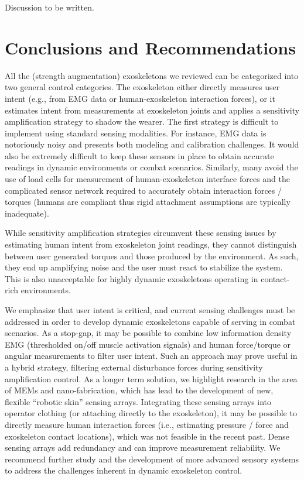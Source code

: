 \documentclass[letterpaper,12pt,fullpage]{article}
\begin{document}
Discussion to be written.

\section{Conclusions and Recommendations}
\label{survey:recommend}

All the (strength augmentation) exoskeletons we reviewed can be categorized into two general control categories.  The exoskeleton either directly measures user intent (e.g., from EMG data or human-exoskeleton interaction forces), or it estimates intent from measurements at exoskeleton joints and applies a sensitivity amplification strategy to shadow the wearer.  The first strategy is difficult to implement using standard sensing modalities.  For instance, EMG data is notoriously noisy and presents both modeling and calibration challenges.  It would also be extremely difficult to keep these sensors in place to obtain accurate readings in dynamic environments or combat scenarios.  Similarly, many avoid the use of load cells for measurement of human-exoskeleton interface forces and the complicated sensor network required to accurately obtain interaction forces / torques (humans are compliant thus rigid attachment assumptions are typically inadequate).

While sensitivity amplification strategies circumvent these sensing issues by estimating human intent from exoskeleton joint readings, they cannot distinguish between user generated torques and those produced by the environment.  As such, they end up amplifying noise and the user must react to stabilize the system.  This is also unacceptable for highly dynamic exoskeletons operating in contact-rich environments.

We emphasize that user intent is critical, and current sensing challenges must be addressed in order to develop dynamic exoskeletons capable of serving in combat scenarios.  As a stop-gap, it may be possible to combine low information density EMG (thresholded on/off muscle activation signals) and human force/torque or angular measurements to filter user intent.  Such an approach may prove useful in a hybrid strategy, filtering external disturbance forces during sensitivity amplification control.  As a longer term solution, we highlight research in the area of MEMs and nano-fabrication, which has lead to the development of new, flexible ``robotic skin'' sensing arrays.  Integrating these sensing arrays into operator clothing (or attaching directly to the exoskeleton), it may be possible to directly measure human interaction forces (i.e., estimating pressure / force and exoskeleton contact locations), which was not feasible in the recent past.  Dense sensing arrays add redundancy and can improve measurement reliability. We recommend further study and the development of more advanced sensory systems to address the challenges inherent in dynamic exoskeleton control.
\end{document}
